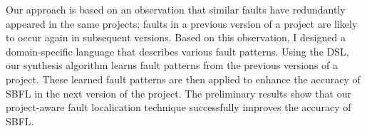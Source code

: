 \documentclass[11pt]{article}
\begin{document}
Our approach is based on an observation that similar faults have redundantly appeared in the same projects; faults in a previous version of a project are likely to occur again in subsequent versions.
%
Based on this observation, I designed a domain-specific language that describes various fault patterns.
%
Using the DSL, our synthesis algorithm learns fault patterns from the previous versions of a project.
%
These learned fault patterns are then applied to enhance the accuracy of SBFL in the next version of the project.
%
The preliminary results show that our project-aware fault localication technique successfully improves the accuracy of SBFL.







\end{document}
